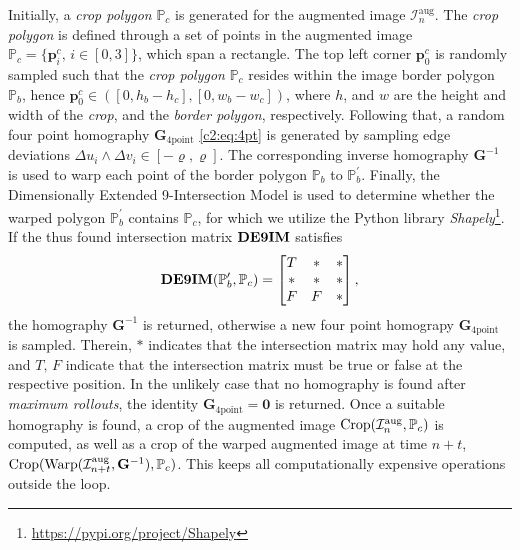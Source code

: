 Initially, a \textit{crop polygon} $\mathbb{P}_c$ is generated for the augmented image $\mathcal{I}^\text{aug}_n$. The \textit{crop polygon} is defined through a set of points in the augmented image $\mathbb{P}_c = \{\mathbf{p}^c_i,\,i\in \left[0,3\right]\}$, which span a rectangle. The top left corner $\mathbf{p}^c_0$ is randomly sampled such that the \textit{crop polygon} $\mathbb{P}_c$ resides within the image border polygon $\mathbb{P}_b$, hence $\mathbf{p}^c_0 \in ([0, h_b - h_c], [0, w_b - w_c])$, where $h$, and $w$ are the height and width of the \textit{crop}, and the \textit{border polygon}, respectively. Following that, a random four point homography $\mathbf{G}_{4\text{point}}$ \eqref{c2:eq:4pt} is generated by sampling edge deviations $\Delta u_i \land \Delta v_i \in [-\varrho, \varrho]$. The corresponding inverse homography $\mathbf{G}^{-1}$ is used to warp each point of the border polygon $\mathbb{P}_b$ to $\mathbb{P}^\prime_b$. Finally, the Dimensionally Extended 9-Intersection Model \cite{clementini1994modelling} is used to determine whether the warped polygon $\mathbb{P}^\prime_b$ contains $\mathbb{P}_c$, for which we utilize the Python library \textit{Shapely}\footnote[3]{\url{https://pypi.org/project/Shapely}}. If the thus found intersection matrix $\operatorname{\mathbf{DE9IM}}$ satisfies
\begin{equation}
    \operatorname{\mathbf{DE9IM}}(\mathbb{P}^\prime_b, \mathbb{P}_c) = \begin{bmatrix}
        T & * & * \\
        * & * & * \\
        F & F & *
    \end{bmatrix},
\end{equation}
the homography $\mathbf{G}^{-1}$ is returned, otherwise a new four point homograpy $\mathbf{G}_{4\text{point}}$ is sampled. Therein, $*$ indicates that the intersection matrix may hold any value, and $T,\,F$ indicate that the intersection matrix must be true or false at the respective position. In the unlikely case that no homography is found after \textit{maximum rollouts}, the identity $\mathbf{G}_{4\text{point}} = \mathbf{0}$ is returned. Once a suitable homography is found, a crop of the augmented image $\operatorname{Crop}(\mathcal{I}^\text{aug}_n, \mathbb{P}_c)$ is computed, as well as a crop of the warped augmented image at time $n+t$, $\operatorname{Crop}(\operatorname{Warp}(\mathcal{I}^\text{aug}_{n+t}, \mathbf{G}^{-1}), \mathbb{P}_c)$. This keeps all computationally expensive operations outside the loop.

